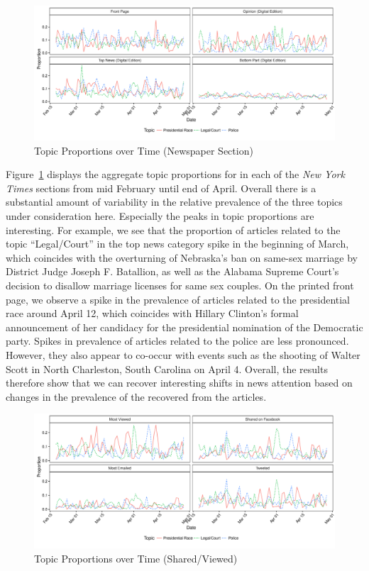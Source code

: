 \documentclass[12pt]{article}
\begin{document}
\begin{doublespace}
\begin{figure}
\caption{Topic Proportions over Time (Newspaper Section)}\label{fig:series_nyt_main}
\includegraphics[width=\textwidth]{../calc/fig/series_nyt_main}
\end{figure}

Figure~\ref{fig:series_nyt_main} displays the aggregate topic proportions for in each of the \textit{New York Times} sections from mid February until end of April. Overall there is a substantial amount of variability in the relative prevalence of the three topics under consideration here. Especially the peaks in topic proportions are interesting. For example, we see that the proportion of articles related to the topic ``Legal/Court'' in the top news category spike in the beginning of March, which coincides with the overturning of Nebraska's ban on same-sex marriage by District Judge Joseph F. Batallion, as well as the Alabama Supreme Court's decision to disallow marriage licenses for same sex couples. On the printed front page, we observe a spike in the prevalence of articles related to the presidential race around April 12, which coincides with Hillary Clinton's formal announcement of her candidacy for the presidential nomination of the Democratic party. Spikes in prevalence of articles related to the police are less pronounced. However, they also appear to co-occur with events such as the shooting of Walter Scott in North Charleston, South Carolina on April 4. Overall, the results therefore show that we can recover interesting shifts in news attention based on changes in the prevalence of the recovered from the articles.

\begin{figure}
\caption{Topic Proportions over Time (Shared/Viewed)}\label{fig:series_share_main}
\includegraphics[width=\textwidth]{../calc/fig/series_share_main}
\end{figure}


\end{doublespace}
\end{document}
